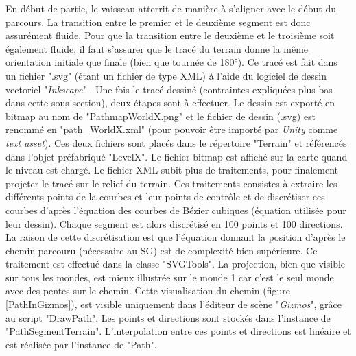 		En début de partie, le vaisseau atterrit de manière à s'aligner avec le début du parcours. La transition entre le premier et le deuxième segment est donc assurément fluide. Pour que la transition entre le deuxième et le troisième soit également fluide, il faut s'assurer que le tracé du terrain donne la même orientation initiale que finale (bien que tournée de 180°). Ce tracé est fait dans un fichier ".svg" (étant un fichier de type XML) à l'aide du logiciel de dessin vectoriel "\textit{Inkscape}" \cite{Inkscape_website}. 		
		Une fois le tracé dessiné (contraintes expliquées plus bas dans cette sous-section), deux étapes sont à effectuer. Le dessin est exporté en bitmap au nom de "PathmapWorldX.png" et le fichier de dessin (.svg) est renommé en "path\_WorldX.xml" (pour pouvoir être importé par \textit{Unity} comme \textit{text asset}). Ces deux fichiers sont placés dans le répertoire "Terrain" et référencés dans l'objet préfabriqué "LevelX". Le fichier bitmap est affiché sur la carte quand le niveau est chargé. Le fichier XML subit plus de traitements, pour finalement projeter le tracé sur le relief du terrain. Ces traitements consistes à extraire les différents points de la courbes et leur points de contrôle et de discrétiser ces courbes d'après l'équation des courbes de Bézier cubiques \cite{CompAlg} (équation utilisée pour leur dessin). Chaque segment est alors discrétisé en 100 points et 100 directions. La raison de cette discrétisation est que l'équation donnant la position d'après le chemin parcouru (nécessaire au SG) est de complexité bien supérieure. Ce traitement est effectué dans la classe "SVGTools". La projection, bien que visible sur tous les mondes, est mieux illustrée sur le monde 1 car c'est le seul monde avec des pentes sur le chemin. Cette visualisation du chemin (figure \ref{PathInGizmos}), est visible uniquement dans l'éditeur de scène "\textit{Gizmos}", grâce au script "DrawPath". Les points et directions sont stockés dans l'instance de "PathSegmentTerrain". L'interpolation entre ces points et directions est linéaire et est réalisée par l'instance de "Path".\medskip
		
		\begin{minipage}{\linewidth}
			\label{PathInGizmos}
		\end{minipage}\medskip
		
